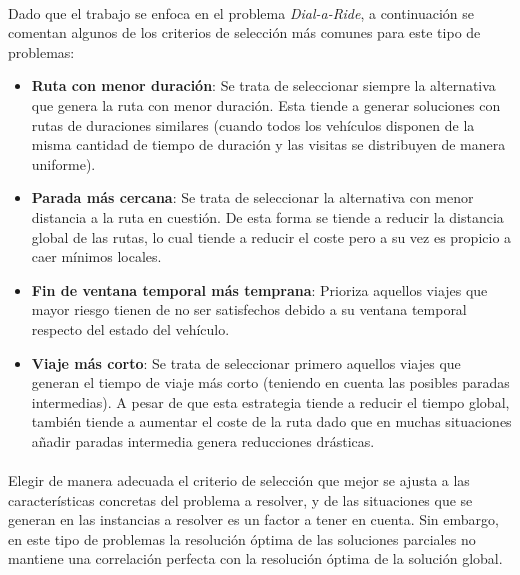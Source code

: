 \documentclass{subfiles}
\begin{document}
          \paragraph{}
          Dado que el trabajo se enfoca en el problema \emph{Dial-a-Ride}, a continuación se comentan algunos de los criterios de selección más comunes para este tipo de problemas:

          \begin{itemize}

            \item \textbf{Ruta con menor duración}: Se trata de seleccionar siempre la alternativa que genera la ruta con menor duración. Esta tiende a generar soluciones con rutas de duraciones similares (cuando todos los vehículos disponen de la misma cantidad de tiempo de duración y las visitas se distribuyen de manera uniforme).

            \item \textbf{Parada más cercana}: Se trata de seleccionar la alternativa con menor distancia a la ruta en cuestión. De esta forma se tiende a reducir la distancia global de las rutas, lo cual tiende a reducir el coste pero a su vez es propicio a caer mínimos locales.

            \item \textbf{Fin de ventana temporal más temprana}: Prioriza aquellos viajes que mayor riesgo tienen de no ser satisfechos debido a su ventana temporal respecto del estado del vehículo.

            \item \textbf{Viaje más corto}: Se trata de seleccionar primero aquellos viajes que generan el tiempo de viaje más corto (teniendo en cuenta las posibles paradas intermedias). A pesar de que esta estrategia tiende a reducir el tiempo global, también tiende a aumentar el coste de la ruta dado que en muchas situaciones añadir paradas intermedia genera reducciones drásticas.

          \end{itemize}

          \paragraph{}
          Elegir de manera adecuada el criterio de selección que mejor se ajusta a las características concretas del problema a resolver, y de las situaciones que se generan en las instancias a resolver es un factor a tener en cuenta. Sin embargo, en este tipo de problemas la resolución óptima de las soluciones parciales no mantiene una correlación perfecta con la resolución óptima de la solución global.
\end{document}
